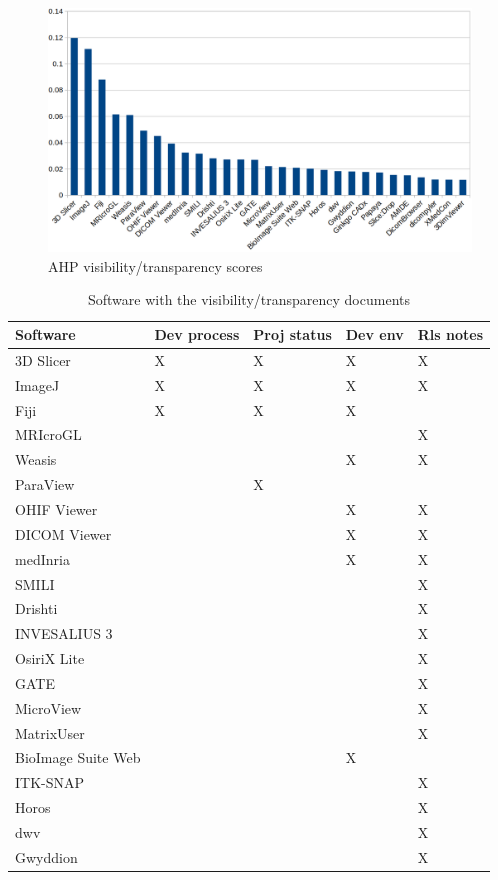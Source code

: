 \documentclass[final, 3p, times, authoryear]{elsarticle}
\begin{document}
\begin{figure}[ht]
\includegraphics[scale=0.38]{figures/visibility_transparency_scores.png}
\caption{AHP visibility/transparency scores}
\label{fg_visibility_transparency_scores}
\end{figure}

\begin{table}[ht]
\centering
\begin{tabular}{lllll}
\hline
Software & Dev process & Proj status & Dev env & Rls notes \\ \hline
3D Slicer & X & X & X & X \\
ImageJ & X & X & X & X \\
Fiji & X & X & X &  \\
MRIcroGL &  &  &  & X \\
Weasis &  &  & X & X \\
ParaView &  & X &  &  \\
OHIF Viewer &  &  & X & X \\
DICOM Viewer &  &  & X & X \\
medInria &  &  & X & X \\
SMILI &  &  &  & X \\
Drishti &  &  &  & X \\
INVESALIUS 3 &  &  &  & X \\
OsiriX Lite &  &  &  & X \\
GATE &  &  &  & X \\
MicroView &  &  &  & X \\
MatrixUser &  &  &  & X \\
BioImage Suite Web &  &  & X &  \\
ITK-SNAP &  &  &  & X \\
Horos &  &  &  & X \\
dwv &  &  &  & X \\
Gwyddion &  &  &  & X \\ \hline
\end{tabular}
\caption{\label{tab_Visibility/Transparency_docs}Software with the visibility/transparency documents}
\end{table}
\end{document}
